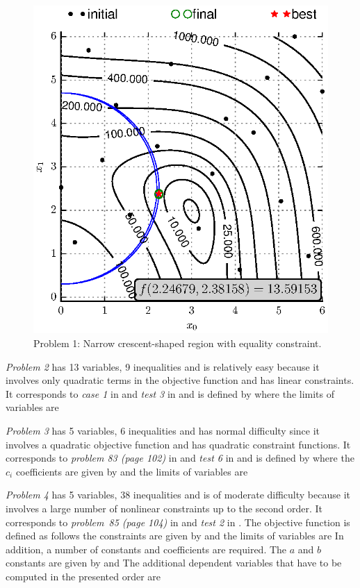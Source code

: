 \documentclass[final,5p,times,twocolumn]{elsarticle}
\begin{document}
\begin{figure} \centering
\includegraphics[scale=0.9]{./figs/res/simpleoptm3.eps}
\caption{Problem 1: Narrow crescent-shaped region with equality constraint.}
\label{fig:simple3}
\end{figure}


\emph{Problem 2} has 13 variables, 9 inequalities and is relatively easy because it involves only
quadratic terms in the objective function and has linear constraints. It corresponds to
\emph{case 1} in \citep{mich:95} and
\emph{test 3} in \citep{deb:00}
and is defined by
\OptmProbTwo
where the limits of variables are
\OptmProbTwoX


\emph{Problem 3} has 5 variables, 6 inequalities and has normal difficulty since it involves a
quadratic objective function and has quadratic constraint functions. It corresponds to
\emph{problem 83 (page 102)} in \citep{hock:81} and
\emph{test 6} in \citep{deb:00} 
and is defined by
\OptmProbThreeB
where the $c_i$ coefficients are given by
\OptmProbThreeA
and the limits of variables are
\OptmProbThreeX


\emph{Problem 4} has 5 variables, 38 inequalities and is of moderate difficulty because it involves
a large number of nonlinear constraints up to the second order. It corresponds to
\emph{{problem~85} (page 104)} in \citep{hock:81} and
\emph{test 2} in \citep{deb:00}. The objective function is defined as follows
\OptmProbFourCa
the constraints are given by
\OptmProbFourCb
and the limits of variables are
\OptmProbFourX
In addition, a number of constants and coefficients are required. The $a$ and $b$ constants are given by
\OptmProbFourD
and
\OptmProbFourE
The additional dependent variables that have to be computed in the presented order are
\OptmProbFourAB
\end{document}

